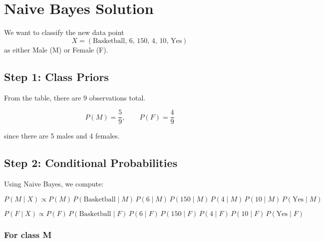 \documentclass[11pt]{article}
\newcommand{\R}{\mathbb{R}}
\newcommand{\mtx}[1]{\mathbf{#1}}
\newcommand{\vct}[1]{\mathbf{#1}}
\def \mA {\mtx{A}}
\def \mZ {\mtx{Z}}
\def \vx {\vct{x}}
\def \vy {\vct{y}}
\def \R {\mathbb{R}}
\begin{document}


\section*{Naive Bayes Solution}

We want to classify the new data point
\[
X=(\text{Basketball},\,6,\,150,\,4,\,10,\,\text{Yes})
\]
as either Male (M) or Female (F).

\subsection*{Step 1: Class Priors}

From the table, there are 9 observations total.

\[
P(M)=\frac{5}{9}, \qquad P(F)=\frac{4}{9}
\]

since there are 5 males and 4 females.

\subsection*{Step 2: Conditional Probabilities}

Using Naive Bayes, we compute:

\[
P(M\mid X)\propto P(M)\,P(\text{Basketball}\mid M)\,P(6\mid M)\,P(150\mid M)\,P(4\mid M)\,P(10\mid M)\,P(\text{Yes}\mid M)
\]

\[
P(F\mid X)\propto P(F)\,P(\text{Basketball}\mid F)\,P(6\mid F)\,P(150\mid F)\,P(4\mid F)\,P(10\mid F)\,P(\text{Yes}\mid F)
\]

\subsubsection*{For class M}
\end{document}
